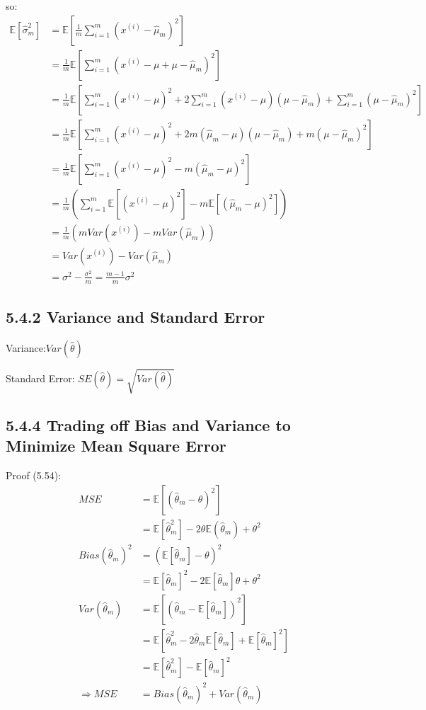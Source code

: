 \documentclass[12pt]{article}
\numberwithin{equation}{section}
\begin{document}
so:
\begin{align*}
\mathbb{E}[\hat{\sigma}^2_m]
&=\mathbb{E}[\frac{1}{m}\sum_{i=1}^{m}(x^{(i)}-\hat{\mu}_m)^2] \\
&=\frac{1}{m}\mathbb{E}[\sum_{i=1}^{m}(x^{(i)}-\mu+\mu-\hat{\mu}_m)^2] \\
&=\frac{1}{m}\mathbb{E}[\sum_{i=1}^{m}(x^{(i)}-\mu)^2+2\sum_{i=1}^{m}(x^{(i)}-\mu)(\mu-\hat{\mu}_m)+\sum_{i=1}^{m}(\mu-\hat{\mu}_m)^2] \\
&=\frac{1}{m}\mathbb{E}[\sum_{i=1}^{m}(x^{(i)}-\mu)^2+2m(\hat{\mu}_m-\mu)(\mu-\hat{\mu}_m)+m(\mu-\hat{\mu}_m)^2] \\
&=\frac{1}{m}\mathbb{E}[\sum_{i=1}^{m}(x^{(i)}-\mu)^2-m(\hat{\mu}_m-\mu)^2] \\
&=\frac{1}{m}(\sum_{i=1}^{m}\mathbb{E}[(x^{(i)}-\mu)^2]-m\mathbb{E}[(\hat{\mu}_m-\mu)^2]) \\
&=\frac{1}{m}(mVar(x^{(i)})-mVar(\hat{\mu}_m)) \\
&=Var(x^{(i)})-Var(\hat{\mu}_m) \\
&=\sigma^2-\frac{\sigma^2}{m}=\frac{m-1}{m}\sigma^2
\end{align*}

\subsection{5.4.2 Variance and Standard Error}
Variance:$ Var(\hat{\theta})$

Standard Error: $SE(\hat{\theta})=\sqrt{Var(\hat{\theta})}$

\subsection{5.4.4 Trading off Bias and Variance to Minimize Mean Square Error}

Proof (5.54):
\begin{align*}
MSE
&=\mathbb{E}[(\hat{\theta}_m-\theta)^2] \\
&=\mathbb{E}[\hat{\theta}_m^2]-2\theta\mathbb{E}(\hat{\theta}_m)+\theta^2 \\
Bias(\hat{\theta}_m)^2
&=(\mathbb{E}[\hat{\theta}_m]-\theta)^2 \\
&=\mathbb{E}[\hat{\theta}_m]^2-2\mathbb{E}[\hat{\theta}_m]\theta+\theta^2 \\
Var(\hat{\theta}_m)
&=\mathbb{E}[(\hat{\theta}_m-\mathbb{E}[\hat{\theta}_m])^2]\\
&=\mathbb{E}[\hat{\theta}_m^2-2\hat{\theta}_m\mathbb{E}[\hat{\theta}_m]+\mathbb{E}[\hat{\theta}_m]^2]\\
&=\mathbb{E}[\hat{\theta}_m^2]-\mathbb{E}[\hat{\theta}_m]^2\\
\Rightarrow
MSE&=Bias(\hat{\theta}_m)^2+Var(\hat{\theta}_m)
\end{align*}
\end{document}
